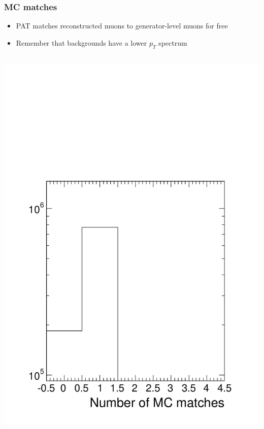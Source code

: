 \documentclass[compress]{beamer}
\begin{document}
\begin{frame}
\frametitle{MC matches}

\begin{itemize}
\item PAT matches reconstructed muons to generator-level muons for free
\item Remember that backgrounds have a lower $p_T$ spectrum
\end{itemize}

\begin{columns}
\includegraphics[width=\linewidth]{nummatches.pdf}

\end{columns}
\end{frame}
\end{document}
